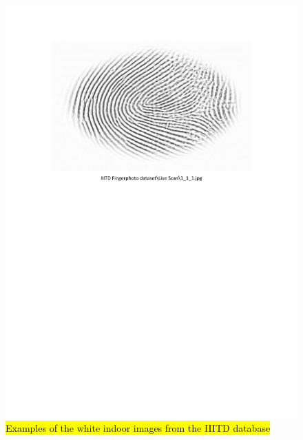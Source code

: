 \documentclass[review]{elsarticle}
\begin{document}
		\begin{figure}[!h]
			\centering
			\includegraphics[page=4,scale=.65,trim=2cm 15cm 2cm 2cm,clip]{IIITD_dataset.pdf}
			\caption{\hl{Examples of the white indoor images from the IIITD database}}
			\label{fig:IIITD_White_Indoor}
		\end{figure}
\end{document}
